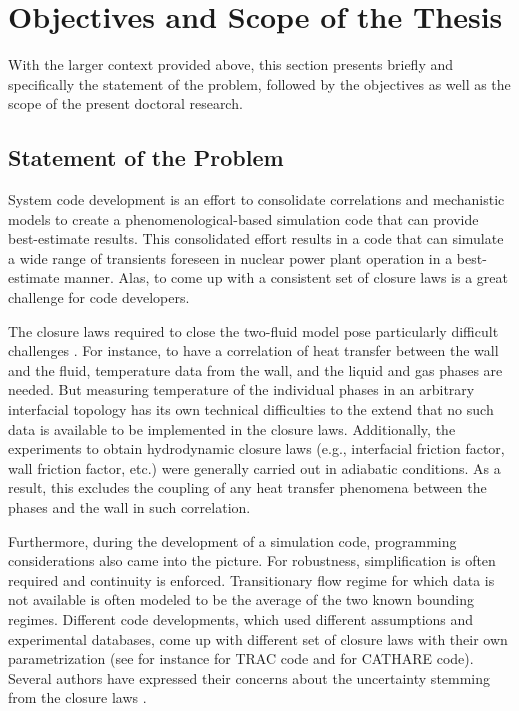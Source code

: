 \section{Objectives and Scope of the Thesis}\label{sec:intro_objectives_and_scope}

With the larger context provided above,
this section presents briefly and specifically the statement of the problem,
followed by the objectives as well as the scope of the present doctoral research.

\subsection{Statement of the Problem}\label{sub:intro_statement_of_problem}

System code development is an effort to consolidate correlations and mechanistic models to create a phenomenological-based simulation code that can provide best-estimate results.
This consolidated effort results in a code that can simulate a wide range of transients foreseen in nuclear power plant operation in a best-estimate manner.
Alas, to come up with a consistent set of closure laws is a great challenge for code developers.

The closure laws required to close the two-fluid model pose particularly difficult challenges \cite{Wulff2007}.
For instance, to have a correlation of heat transfer between the wall and the fluid, temperature data from the wall, and the liquid and gas phases are needed.
But measuring temperature of the individual phases in an arbitrary interfacial topology has its own technical difficulties to the extend that no such data is available to be implemented in the closure laws.
Additionally, the experiments to obtain hydrodynamic closure laws (e.g., interfacial friction factor, wall friction factor, etc.) were generally carried out in adiabatic conditions.
As a result, this excludes the coupling of any heat transfer phenomena between the phases and the wall in such correlation.

Furthermore, during the development of a simulation code, programming considerations also came into the picture.
For robustness, simplification is often required and continuity is enforced.
Transitionary flow regime for which data is not available is often modeled to be the average of the two known bounding regimes.
Different code developments, which used different assumptions and experimental databases, come up with different set of closure laws with their own parametrization (see for instance \cite{Nelson1992} for TRAC code and \cite{Bestion1990} for CATHARE code).
Several authors have expressed their concerns about the uncertainty stemming from the closure laws \cite{Wulff2007,Petruzzi2008a,DAuria2012}.

